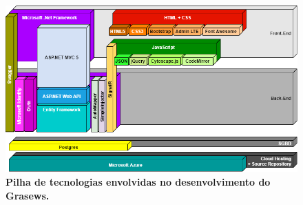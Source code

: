 \begin{landscape}
    \begin{figure}[h]
        \includegraphics[scale=0.7]{4-grasews/imagens/grasews-technology-stack.png}
        \centering
        \caption[Pilha de tecnologias envolvidas no desenvolvimento do Grasews]{\textbf{Pilha de tecnologias envolvidas no desenvolvimento do Grasews.}}
        \label{fig:grasews-technology-stack}
    \end{figure}
\end{landscape}